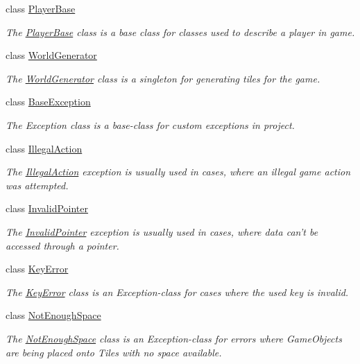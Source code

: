 \begin{DoxyCompactItemize}
class \hyperlink{classCourse_1_1PlayerBase}{Player\-Base}
\begin{DoxyCompactList}\small\item\em The \hyperlink{classCourse_1_1PlayerBase}{Player\-Base} class is a base class for classes used to describe a player in game. \end{DoxyCompactList}\item 
class \hyperlink{classCourse_1_1WorldGenerator}{World\-Generator}
\begin{DoxyCompactList}\small\item\em The \hyperlink{classCourse_1_1WorldGenerator}{World\-Generator} class is a singleton for generating tiles for the game. \end{DoxyCompactList}\item 
class \hyperlink{classCourse_1_1BaseException}{Base\-Exception}
\begin{DoxyCompactList}\small\item\em The Exception class is a base-\/class for custom exceptions in project. \end{DoxyCompactList}\item 
class \hyperlink{classCourse_1_1IllegalAction}{Illegal\-Action}
\begin{DoxyCompactList}\small\item\em The \hyperlink{classCourse_1_1IllegalAction}{Illegal\-Action} exception is usually used in cases, where an illegal game action was attempted. \end{DoxyCompactList}\item 
class \hyperlink{classCourse_1_1InvalidPointer}{Invalid\-Pointer}
\begin{DoxyCompactList}\small\item\em The \hyperlink{classCourse_1_1InvalidPointer}{Invalid\-Pointer} exception is usually used in cases, where data can't be accessed through a pointer. \end{DoxyCompactList}\item 
class \hyperlink{classCourse_1_1KeyError}{Key\-Error}
\begin{DoxyCompactList}\small\item\em The \hyperlink{classCourse_1_1KeyError}{Key\-Error} class is an Exception-\/class for cases where the used key is invalid. \end{DoxyCompactList}\item 
class \hyperlink{classCourse_1_1NotEnoughSpace}{Not\-Enough\-Space}
\begin{DoxyCompactList}\small\item\em The \hyperlink{classCourse_1_1NotEnoughSpace}{Not\-Enough\-Space} class is an Exception-\/class for errors where Game\-Objects are being placed onto Tiles with no space available. \end{DoxyCompactList}\item 

\end{DoxyCompactItemize}
